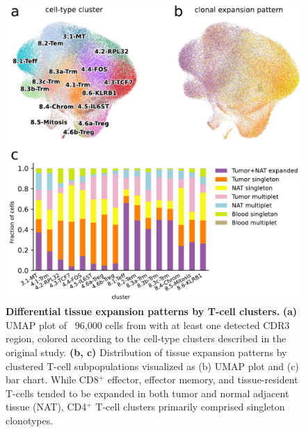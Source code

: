 \documentclass{article}
\begin{document}
\newpage
\begin{figure}[H]
  \centering
  \includegraphics[width=7in]{../figures/expansion_per_cluster.pdf}
  \caption{
    \textbf{Differential tissue expansion patterns by T-cell clusters.} 
    \textbf{(a)} UMAP plot of ~96,000 cells from \textcite{Wu2020-vp} with at least one 
    detected CDR3 region, colored according to the cell-type clusters described in the 
    original study. \textbf{(b, c)} Distribution of tissue expansion patterns by clustered 
    T-cell subpopulations visualized as (b) UMAP plot and (c) bar
    chart. While CD8$^+$ effector, effector memory, and tissue-resident T-cells tended 
    to be expanded in both tumor and normal adjacent tissue (NAT), CD4$^+$ T-cell clusters
    primarily comprised singleton clonotypes.}
\end{figure}
\end{document}
